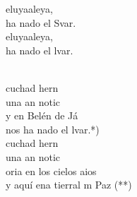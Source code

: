 \documentclass[12pt]{article}
\begin{document}
\begin{multicols*}{2}
\begin{cancion}%
	\begin{chorus}%
	eluyaaleya,\\
	ha nado el Svar.\\
	eluyaaleya,\\
	ha nado el lvar.\\
	\end{chorus}%
	\jump\\
	cuchad hern\\
	una an notic \\
	y en Belén de Já\\
	nos ha nado el lvar.*)\\
	cuchad hern\\
	una an notic  \\
	oria en los cielos aios\\
	y aquí ena tierral m Paz (**)\\
\end{cancion}%


\end{multicols*}
\end{document}
